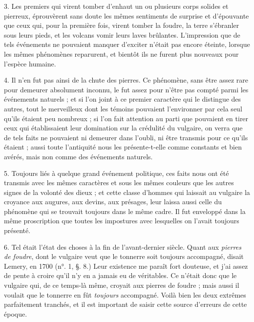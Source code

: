 \documentclass[a4paper, 11pt, oneside, polutonikogreek, french]{article}
\begin{document}
3. Les premiers qui virent tomber d'enhaut un ou plusieurs corps solides et pierreux, éprouvèrent sans doute les mêmes sentiments de surprise et d'épouvante que ceux qui, pour la première fois, virent tomber la foudre, la terre s'ébranler sous leurs pieds, et les volcans vomir leurs laves brûlantes. L'impression que de tels événements ne pouvaient manquer d'exciter n'était pas encore éteinte, lorsque les mêmes phénomènes reparurent, et bientôt ils ne furent plus nouveaux pour l'espèce humaine.

4. Il n'en fut pas ainsi de la chute des pierres. Ce phénomène, sans être assez rare pour demeurer absolument inconnu, le fut assez pour n'être pas compté parmi les événements naturels ; et si l'on joint à ce premier caractère qui le distingue des autres, tout le merveilleux dont les témoins pouvaient l'environner par cela seul qu'ils étaient peu nombreux ; si l'on fait attention au parti que pouvaient en tirer ceux qui établissaient leur domination sur la crédulité du vulgaire, on verra que de tels faits ne pouvaient ni demeurer dans l'oubli, ni être transmis pour ce qu'ils étaient ; aussi toute l'antiquité nous les présente-t-elle comme constants et bien avérés, mais non comme des événements naturels.

5. Toujours liés à quelque grand événement politique, ces faits nous ont été transmis avec les mêmes caractères et sous les mêmes couleurs que les autres signes de la volonté des dieux ; et cette classe d'hommes qui laissait au vulgaire la croyance aux augures, aux devins, aux présages, leur laissa aussi celle du phénomène qui se trouvait toujours dans le même cadre. Il fut enveloppé dans la même proscription que toutes les impostures avec lesquelles on l'avait toujours présenté.

6. Tel était l'état des choses à la fin de l'avant-dernier siècle. \og Quant aux \emph{pierres de foudre}, dont le vulgaire veut que le tonnerre soit toujours accompagné, disait Lemery, en 1700 (n°. 1, §. 8.) Leur existence me paraît fort douteuse, et j'ai assez de pente à croire qu'il n'y en a jamais eu de véritables. \fg Ce n'était donc que le vulgaire qui, de ce temps-là même, croyait aux pierres de foudre ; mais aussi il voulait que le tonnerre en fût \emph{toujours} accompagné. Voilà bien les deux extrêmes parfaitement tranchés, et il est important de saisir cette source d'erreurs de cette époque.
\end{document}
